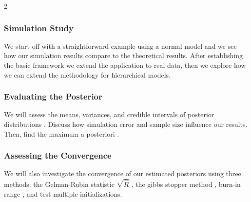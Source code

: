 \documentclass[10pt]{article}
\begin{document}
\begin{multicols*}{2}
\subsubsection*{Simulation Study}
We start off with a straightforward example using a normal model and we see how our simulation results compare to
the theoretical results. After establishing the basic framework we extend the application to real data, then we explore
how we can extend the methodology for hierarchical models.
\subsubsection*{Evaluating the Posterior}
We will assess the means, variances, and credible intervals of posterior distributions \cite{gelman_bayesian_2014}. Discuss how simulation error and
sample size influence our results. Then, find the maximum a posteriori \cite{tsun_maximum_nodate} \cite{rizzo_statistical_2019}. 
\subsubsection*{Assessing the Convergence}
We will also investigate the convergence of our estimated posteriors using three
methods: the Gelman-Rubin statistic $\sqrt{\hat{R}}$ \cite{renard_application_2006} \cite{rizzo_statistical_2019}, the gibbs stopper method \cite{tanner_tools_1996}, burn-in range \cite{cook_mcmc_2016}, and test multiple initializations.

\end{multicols*}
\end{document}
